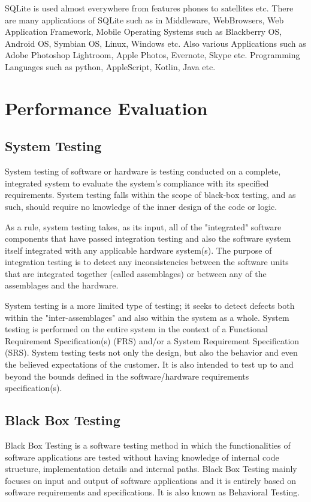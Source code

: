 \par SQLite is used almost everywhere from features phones to satellites etc. There are many applications of SQLite such as in Middleware, WebBrowsers, Web Application Framework, Mobile Operating Systems such as Blackberry OS, Android OS, Symbian OS, Linux, Windows etc. Also various Applications such as Adobe Photoshop Lightroom, Apple Photos, Evernote, Skype etc. Programming Languages such as python, AppleScript, Kotlin, Java etc.

\chapter{Performance Evaluation}
\section{System Testing}
System testing of software or hardware is testing conducted on a complete, integrated system to
evaluate the system's compliance with its specified requirements. System testing falls within the
scope of black-box testing, and as such, should require no knowledge of the inner design of the code
or logic. \par As a rule, system testing takes, as its input, all of the "integrated" software components that have passed integration testing and also the software system itself integrated with any applicable
hardware system(s). The purpose of integration testing is to detect any inconsistencies between the
software units that are integrated together (called assemblages) or between any of
the assemblages and the hardware. \par System testing is a more limited type of testing; it seeks to detect
defects both within the "inter-assemblages" and also within the system as a whole.
System testing is performed on the entire system in the context of a Functional
Requirement Specification(s) (FRS) and/or a System Requirement Specification (SRS). System
testing tests not only the design, but also the behavior and even the believed expectations of the
customer. It is also intended to test up to and beyond the bounds defined in the software/hardware
requirements specification(s).

\section{Black Box Testing}

Black Box Testing is a software testing method in which the functionalities of software applications are tested without having knowledge of internal code structure, implementation details and internal paths. Black Box Testing mainly focuses on input and output of software applications and it is entirely based on software requirements and specifications. It is also known as Behavioral Testing.

